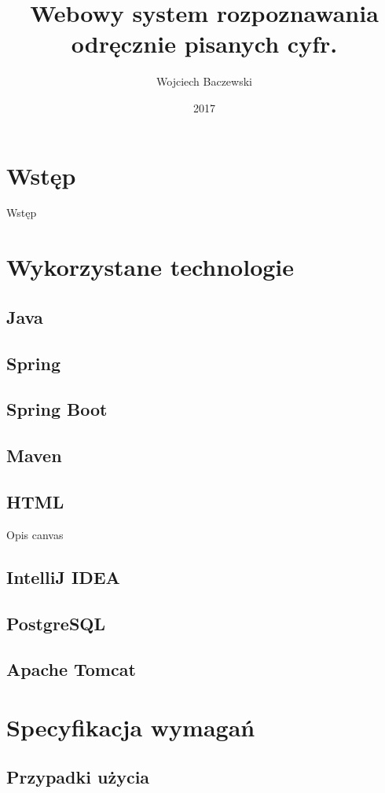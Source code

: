 \documentclass[wmii,inf,mgr]{uwmthesis}
\date{2017}
\title{Webowy system rozpoznawania odręcznie pisanych cyfr.}
\author{Wojciech Baczewski}
\begin{document}
\maketitle

\tableofcontents

\chapter*{Wstęp}

Wstęp


\chapter{Wykorzystane technologie}
\section{Java}


\section{Spring}
\section{Spring Boot}
\section{Maven}
\section{HTML}
Opis canvas

\section{IntelliJ IDEA}
\section{PostgreSQL}
\section{Apache Tomcat}

\chapter{Specyfikacja wymagań}
\section{Przypadki użycia}
\end{document}
